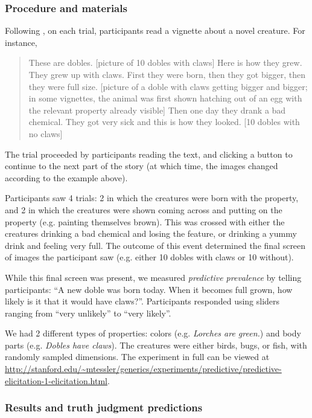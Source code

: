 \documentclass[12pt,letterpaper]{article}
\begin{document}
\subsubsection*{Procedure and materials}
Following , on each trial, participants read a vignette about a novel creature. For instance,
\begin{quote}
These are dobles. [picture of 10 dobles with claws] Here is how they grew. They grew up with claws. First they were born, then they got bigger, then they were full size. [picture of a doble with claws getting bigger and bigger; in some vignettes, the animal was first shown hatching out of an egg with the relevant property already visible] Then one day they drank a bad chemical. They got very sick and this is how they looked. [10 dobles with no claws]
\end{quote}
The trial proceeded by participants reading the text, and clicking a button to continue to the next part of the story (at which time, the images changed according to the example above).

Participants saw 4 trials: 2 in which the creatures were born with the property, and 2 in which the creatures were shown coming across and putting on the property (e.g. painting themselves brown).
This was crossed with either the creatures drinking a bad chemical and losing the feature, or drinking a yummy drink and feeling very full.
The outcome of this event determined the final screen of images the participant saw (e.g. either 10 dobles with claws or 10 without).


While this final screen was present, we measured \emph{predictive prevalence} by telling participants: ``A new doble was born today. When it becomes full grown, how likely is it that it would have claws?''.
Participants responded using sliders ranging from ``very unlikely'' to ``very likely''.

We had 2 different types of properties: colors (e.g. \emph{Lorches are green.}) and body parts (e.g. \emph{Dobles have claws}).
The creatures were either birds, bugs, or fish, with randomly sampled dimensions.
The experiment in full can be viewed at \url{http://stanford.edu/~mtessler/generics/experiments/predictive/predictive-elicitation-1-elicitation.html}.


\subsubsection*{Results and truth judgment predictions}
\end{document}
